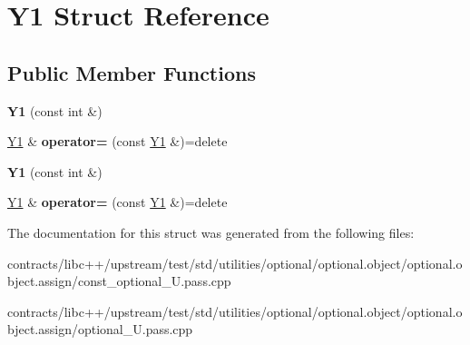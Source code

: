 \hypertarget{struct_y1}{}\section{Y1 Struct Reference}
\label{struct_y1}
\subsection*{Public Member Functions}
\begin{DoxyCompactItemize}
\item 
\mbox{\label{struct_y1_af5b98a08996c840c5fcd8cb3a10a4eff}} 
{\bfseries Y1} (const int \&)
\item 
\mbox{\label{struct_y1_ac5389614ba57d37f013e1b184cf9607b}} 
\mbox{\hyperlink{struct_y1}{Y1}} \& {\bfseries operator=} (const \mbox{\hyperlink{struct_y1}{Y1}} \&)=delete
\item 
\mbox{\label{struct_y1_af5b98a08996c840c5fcd8cb3a10a4eff}} 
{\bfseries Y1} (const int \&)
\item 
\mbox{\label{struct_y1_ac5389614ba57d37f013e1b184cf9607b}} 
\mbox{\hyperlink{struct_y1}{Y1}} \& {\bfseries operator=} (const \mbox{\hyperlink{struct_y1}{Y1}} \&)=delete
\end{DoxyCompactItemize}


The documentation for this struct was generated from the following files\+:\begin{DoxyCompactItemize}
\item 
contracts/libc++/upstream/test/std/utilities/optional/optional.\+object/optional.\+object.\+assign/const\+\_\+optional\+\_\+\+U.\+pass.\+cpp\item 
contracts/libc++/upstream/test/std/utilities/optional/optional.\+object/optional.\+object.\+assign/optional\+\_\+\+U.\+pass.\+cpp\end{DoxyCompactItemize}
